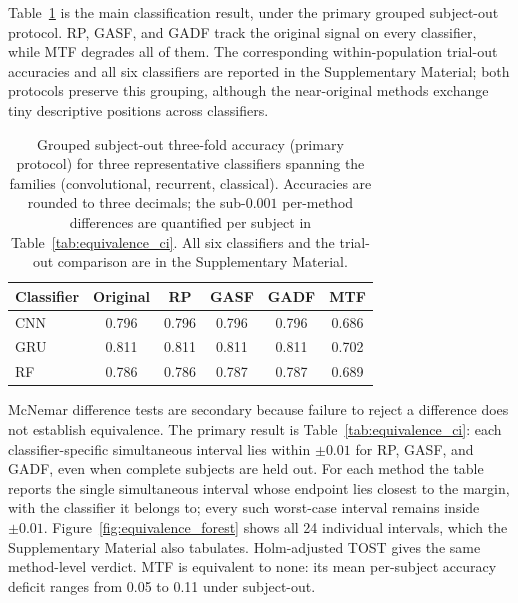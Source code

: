 \documentclass[preprint,12pt]{elsarticle}
\begin{document}
Table~\ref{tab:subject_out_acc} is the main classification result, under the primary grouped subject-out protocol. RP, GASF, and GADF track the original signal on every classifier, while MTF degrades all of them. The corresponding within-population trial-out accuracies and all six classifiers are reported in the Supplementary Material; both protocols preserve this grouping, although the near-original methods exchange tiny descriptive positions across classifiers.

\begin{table}[H]
\centering
\caption{Grouped subject-out three-fold accuracy (primary protocol) for three representative classifiers spanning the families (convolutional, recurrent, classical). Accuracies are rounded to three decimals; the sub-$0.001$ per-method differences are quantified per subject in Table~\ref{tab:equivalence_ci}. All six classifiers and the trial-out comparison are in the Supplementary Material.}\label{tab:subject_out_acc}
\begin{tabular}{lccccc}
\toprule
Classifier & Original & RP & GASF & GADF & MTF \\
\midrule
CNN & 0.796 & 0.796 & 0.796 & 0.796 & 0.686 \\
GRU & 0.811 & 0.811 & 0.811 & 0.811 & 0.702 \\
RF  & 0.786 & 0.786 & 0.787 & 0.787 & 0.689 \\
\bottomrule
\end{tabular}
\end{table}

McNemar difference tests are secondary because failure to reject a difference does not establish equivalence. The primary result is Table~\ref{tab:equivalence_ci}: each classifier-specific simultaneous interval lies within \(\pm0.01\) for RP, GASF, and GADF, even when complete subjects are held out. For each method the table reports the single simultaneous interval whose endpoint lies closest to the margin, with the classifier it belongs to; every such worst-case interval remains inside \(\pm0.01\). Figure~\ref{fig:equivalence_forest} shows all 24 individual intervals, which the Supplementary Material also tabulates. Holm-adjusted TOST gives the same method-level verdict. MTF is equivalent to none: its mean per-subject accuracy deficit ranges from 0.05 to 0.11 under subject-out.
\end{document}

